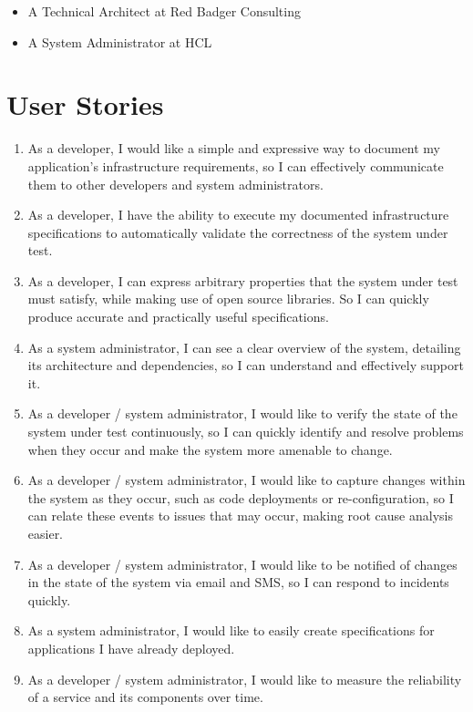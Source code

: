 \documentclass{cshonours}
\begin{document}
\begin{itemize}
  \item A Technical Architect at Red Badger Consulting
  \item A System Administrator at HCL
\end{itemize}

\section{User Stories}
\begin{enumerate}
  \item As a developer, I would like a simple and expressive way to document my application's infrastructure requirements, so I can effectively communicate them to other developers and system administrators.
  \item As a developer, I have the ability to execute my documented infrastructure specifications to automatically validate the correctness of the system under test.
  \item As a developer, I can express arbitrary properties that the system under test must satisfy, while making use of open source libraries. So I can quickly produce accurate and practically useful specifications.
  \item As a system administrator, I can see a clear overview of the system, detailing its architecture and dependencies, so I can understand and effectively support it.
  \item As a developer / system administrator, I would like to verify the state of the system under test continuously, so I can quickly identify and resolve problems when they occur and make the system more amenable to change.
  \item As a developer / system administrator, I would like to capture changes within the system as they occur, such as code deployments or re-configuration, so I can relate these events to issues that may occur, making root cause analysis easier.
  \item As a developer / system administrator, I would like to be notified of changes in the state of the system via email and SMS, so I can respond to incidents quickly.
  \item As a system administrator, I would like to easily create specifications for applications I have already deployed.
  \item As a developer / system administrator, I would like to measure the reliability of a service and its components over time.
\end{enumerate}
\end{document}
